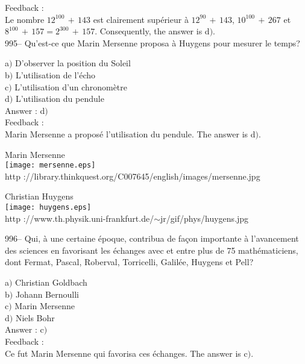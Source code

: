 ﻿\documentclass[letterpaper, 12pt]{article}
\begin{document}
Feedback : \\
Le nombre $12^{100}\,+\,143$ est clairement sup\'erieur \`a
$12^{90}\,+\,143$, $10^{100}\,+\,267$ et
$8^{100}\,+\,157=2^{300}\,+\,157$.
Consequently, the answer is d$)$.\\

995-- Qu'est-ce que Marin Mersenne proposa \`a Huygens pour mesurer
le temps?

a$)$ D'observer la position du Soleil \\
b$)$ L'utilisation de l'\'echo \\
c$)$ L'utilisation d'un chronom\`etre \\
d$)$ L'utilisation du pendule\\

Answer : d$)$\\

Feedback : \\
Marin Mersenne a propos\'e l'utilisation du pendule.
The answer is d$)$.\\

        \begin{center}
        Marin Mersenne\\
    \texttt{[image: mersenne.eps]}\\
        {\footnotesize http
://library.thinkquest.org/C007645/english/images/mersenne.jpg}
    \end{center}

        \begin{center}
        Christian Huygens\\
    \texttt{[image: huygens.eps]}\\
        {\footnotesize http
://www.th.physik.uni-frankfurt.de/$\sim$jr/gif/phys/huygens.jpg}
    \end{center}

996-- Qui, \`a une certaine \'epoque, contribua de fa\c con importante \`a
l'avancement des sciences en favorisant
les \'echanges avec et entre plus de 75 math\'ematiciens, dont Fermat,
Pascal, Roberval, Torricelli, Galil\'ee, Huygens et Pell?

a$)$ Christian Goldbach \\
b$)$ Johann Bernoulli \\
c$)$ Marin Mersenne \\
d$)$ Niels Bohr \\

Answer : c$)$\\

Feedback : \\
Ce fut Marin Mersenne qui favorisa ces \'echanges.
The answer is c$)$.\\
\end{document}
